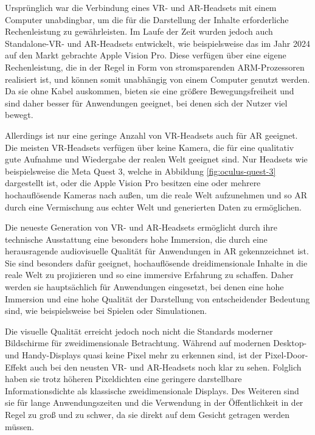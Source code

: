     
    Ursprünglich war die Verbindung eines VR- und AR-Headsets mit einem Computer unabdingbar, um die für die Darstellung der Inhalte erforderliche Rechenleistung zu gewährleisten.
    Im Laufe der Zeit wurden jedoch auch Standalone-VR- und AR-Headsets entwickelt, wie beispielsweise das im Jahr 2024 auf den Markt gebrachte Apple Vision Pro.
    Diese verfügen über eine eigene Rechenleistung, die in der Regel in Form von stromsparenden ARM-Prozessoren realisiert ist, und können somit unabhängig von einem Computer genutzt werden.
    Da sie ohne Kabel auskommen, bieten sie eine größere Bewegungsfreiheit und sind daher besser für Anwendungen geeignet, bei denen sich der Nutzer viel bewegt.

    Allerdings ist nur eine geringe Anzahl von VR-Headsets auch für AR geeignet.
    Die meisten VR-Headsets verfügen über keine Kamera, die für eine qualitativ gute Aufnahme und Wiedergabe der realen Welt geeignet sind.
    Nur Headsets wie beispielsweise die Meta Quest 3, welche in Abbildung \ref{fig:oculus-quest-3} dargestellt ist, oder die Apple Vision Pro besitzen eine oder mehrere hochauflösende Kameras nach außen, um die reale Welt aufzunehmen und so AR durch eine Vermischung aus echter Welt und generierten Daten zu ermöglichen.
    
    Die neueste Generation von VR- und AR-Headsets ermöglicht durch ihre technische Ausstattung eine besonders hohe Immersion, die durch eine herausragende audiovisuelle Qualität für Anwendungen in AR gekennzeichnet ist.
    Sie sind besonders dafür geeignet, hochauflösende dreidimensionale Inhalte in die reale Welt zu projizieren und so eine immersive Erfahrung zu schaffen.
    Daher werden sie hauptsächlich für Anwendungen eingesetzt, bei denen eine hohe Immersion und eine hohe Qualität der Darstellung von entscheidender Bedeutung sind, wie beispielsweise bei Spielen oder Simulationen.

    Die visuelle Qualität erreicht jedoch noch nicht die Standards moderner Bildschirme für zweidimensionale Betrachtung.
    Während auf modernen Desktop- und Handy-Displays quasi keine Pixel mehr zu erkennen sind, ist der Pixel-Door-Effekt auch bei den neusten VR- und AR-Headsets noch klar zu sehen.
    Folglich haben sie trotz höheren Pixeldichten eine geringere darstellbare Informationsdichte als klassische zweidimensionale Displays.
    Des Weiteren sind sie für lange Anwendungszeiten und die Verwendung in der Öffentlichkeit in der Regel zu groß und zu schwer, da sie direkt auf dem Gesicht getragen werden müssen.

